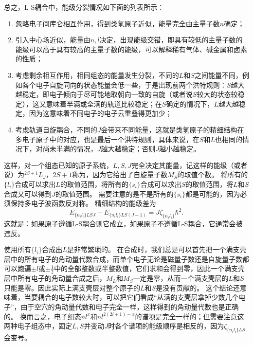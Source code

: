 总之，L-S耦合中，能级分裂情况如下面的列表所示：
\begin{enumerate}
    \item 忽略电子间库仑相互作用，得到类氢原子近似，能量完全由主量子数$n$确定；
    \item 引入中心场近似，能量由$n, l$决定，出现能级交错，即具有较低的主量子数的能级可以高于具有较高的主量子数的能级，可以解释稀有气体、碱金属和卤素的性质；
    \item 考虑剩余相互作用，相同组态的能量发生分裂，不同的$L$和$S$之间能量不同，例如各个电子自旋同向的状态能量会低一些，于是出现前两个洪特规则：$S$越大越稳定，即电子倾向于尽可能地取朝向一致的自旋（或者说$S$较大的状态较稳定），这又意味着半满或全满的轨道比较稳定；在$S$确定的情况下，$L$越大越稳定，因为这意味着不同电子的电子云重叠得更加少；
    \item 考虑轨道自旋耦合，不同的$J$会带来不同能量，这就是类氢原子的精细结构在多电子原子中的对应，也是最后一个洪特规则，具体来说，在$S$和$L$也相同的情况下，对尚未半满的情况，$J$越大越稳定；否则$J$越小越稳定。
\end{enumerate}
这样，对一个组态已知的原子系统，$L, S, J$完全决定其能量，记这样的能级（或者说）为$^{2S+1} L_J$，$2S+1$称为，因为它给出了自旋量子数$M_S$的取值个数。
将所有的$\{l_i\}$合成可以求出$L$的取值范围，将所有的$\{s_i\}$合成可以求出$S$的取值范围，将$L$和$S$合成又可以得到$J$的取值范围。
需要注意的是不是所有的$\{s_i\}$都是可能的，因为必须保持多电子波函数反对称。
精细结构的能级差为
\begin{equation}
    E_{\{n_i l_i\} LSJ} - E_{\{n_i l_i\} LS(J-1)} = J \zeta_{\{n_i l_i\}} \hbar^2.
    \label{eq:lande-gapping}
\end{equation}
这就是：如果原子遵循L-S耦合则它成立，如果原子不遵循L-S耦合，它通常会被违反。

使用所有$\{l_i\}$合成出$L$是非常繁琐的。
在合成时，我们总是可以首先把一个满支壳层中的所有电子的角动量代数合成，而单个电子无论是磁量子数还是自旋量子数都可以跑遍$\pm l$或$\pm \frac{1}{2}$中的全部整数或半整数值，它们求和会得到零，因此一个满支壳层中所有电子的角动量合成之后，$M_L$和$M_S$一定是零，从而一个满支壳层的$L$和$S$只能是零。因此实际上满支壳层对整个原子的$L$和$S$是没有贡献的。
这个结论还意味着，当要耦合的电子数较大时，可以把它们看成“从满的支壳层拿掉少数几个电子”，由于空穴的角动量代数和电子完全一样，这样得到的角动量代数也是正确的。
换而言之，电子组态$nl^x$和$nl^{2(2l+1)-x}$的谱项是完全一样的；但需要注意这两种电子组态中，固定$L,S$并变动$J$时各个谱项的能级顺序是相反的，因为$\zeta_{\{n_i l_i\}LS}$会变号。

